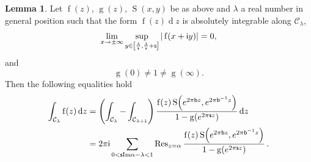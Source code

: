 \documentclass[12pt]{amsart}
\theoremstyle{definition}
\newtheorem{lemma}[theorem]{Lemma}
\newcommand{\im}{\mathsf{i}}
\begin{document}
\begin{lemma}
\label{lem.main} Let $\operatorname{f}(z)$, 
$\operatorname{g}\!\left(z\right)$, $\operatorname{S}\!\left(x,y\right)$ 
be as above and $\lambda$ a real number in general position such that
the form $\operatorname{f}(z)\operatorname{d}\!z$ is absolutely integrable 
along 
$\mathcal{C}_{\lambda}$,
\begin{equation}
\label{cii}
\lim_{x\to\pm\infty}
\sup_{y\in \left[{\lambda\over \mathsf{s}},{\lambda\over \mathsf{s}}+\mathsf{s}\right]}|
\operatorname{f}(x+\im y)|=0,
\end{equation}
and
\begin{equation}
\label{ciii}
\operatorname{g}\!\left(0\right)\ne 1\ne \operatorname{g}\!\left(\infty\right).
\end{equation}
Then  the following equalities hold
\begin{align}
\label{eq.main}
\int_{\mathcal{C}_{\lambda}}\operatorname{f}(z)\operatorname{d}\!z &=
\left(\int_{\mathcal{C}_{\lambda}}-\int_{\mathcal{C}_{\lambda+1}}\right)
\frac{\operatorname{f}(z)\operatorname{S}\!
\left(e^{2\pi\mathsf{b}z},e^{2\pi\mathsf{b}^{-1}z}\right)}{1-\operatorname{g}\!
\left(e^{2\pi\mathsf{s}z}\right)}\operatorname{d}\!z \\ \notag
& =2\pi\im\sum_{0<\mathsf{s}\mathrm{Im}\alpha-\lambda<1}\operatorname{Res}_{z=\alpha}
\frac{\operatorname{f}(z)\operatorname{S}\!
\left(e^{2\pi\mathsf{b}z},e^{2\pi\mathsf{b}^{-1}z}\right)}{1-\operatorname{g}\!
\left(e^{2\pi\mathsf{s}z}\right)} \,.
\end{align}
\end{lemma}
\end{document}
